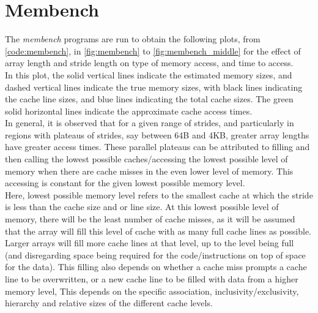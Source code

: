 \documentclass[letterpaper]{article}
\title{\large \doctitle}
\author{}
\date{}%
\begin{document}
\maketitle
\pagestyle{fancy}




\section{Membench}
The \textit{membench} programs are run to obtain the following plots, from \cref{code:membench}, in \cref{fig:membench} to \cref{fig:membench_middle} for the effect of array length and stride length on type of memory access, and time to access. \\ 

In this plot, the solid vertical lines indicate the estimated memory sizes, and dashed vertical lines indicate the true memory sizes, with black lines indicating the cache line sizes, and blue lines indicating the total cache sizes. The green solid horizontal lines indicate the approximate cache access times. \\

In general, it is observed that for a given range of strides, and particularly in regions with plateaus of strides, say between 64B and 4KB, greater array lengths have greater access times. These parallel plateaus can be attributed to filling and then calling the lowest possible caches/accessing the lowest possible level of memory when there are cache misses in the even lower level of memory. This accessing is constant for the given lowest possible memory level. \\

Here, lowest possible memory level refers to the smallest cache at which the stride is less than the cache size and or line size. At this lowest possible level of memory, there will be the least number of cache misses, as it will be assumed that the array will fill this level of cache with as many full cache lines as possible. Larger arrays will fill more cache lines at that level, up to the level being full (and disregarding space being required for the code/instructions on top of space for the data). This filling also depends on whether a cache miss prompts a cache line to be overwritten, or a new cache line to be filled with data from a higher memory level, This depends on the specific association, inclusivity/exclusivity, hierarchy and relative sizes of the different cache levels. \\
\end{document}
